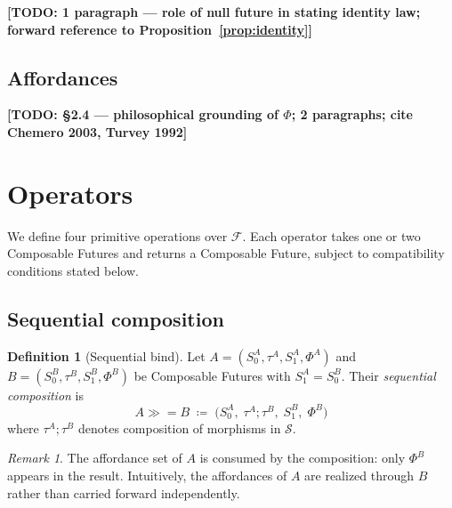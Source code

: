 \documentclass[11pt, a4paper]{article}
\theoremstyle{plain}
\theoremstyle{definition}
\newtheorem{definition}[theorem]{Definition}
\theoremstyle{remark}
\newtheorem{remark}[theorem]{Remark}
\newcommand{\bind}{\mathbin{\gg\!=}}          %
\newcommand{\Fut}{\mathcal{F}}                 %
\newcommand{\States}{\mathcal{S}}              %
\newcommand{\Szero}{S_0}                       %
\newcommand{\Sone}{S_1}                        %
\newcommand{\traj}{\tau}                       %
\newcommand{\aff}{\Phi}                        %
\begin{document}
\textbf{[TODO: 1 paragraph — role of null future in stating identity law;
forward reference to Proposition~\ref{prop:identity}]}

\subsection{Affordances}


\textbf{[TODO: \S2.4 — philosophical grounding of $\aff$; 2 paragraphs;
cite Chemero 2003, Turvey 1992]}

\section{Operators}
\label{sec:operators}

We define four primitive operations over $\Fut$.
Each operator takes one or two Composable Futures and returns a Composable
Future, subject to compatibility conditions stated below.

\subsection{Sequential composition}

\begin{definition}[Sequential bind]
\label{def:bind}
Let $A = (\Szero^A, \traj^A, \Sone^A, \aff^A)$ and
$B = (\Szero^B, \traj^B, \Sone^B, \aff^B)$ be Composable Futures
with $\Sone^A = \Szero^B$.
Their \emph{sequential composition} is
\[
  A \bind B \;\coloneqq\;
  \bigl(\Szero^A,\; \traj^A ; \traj^B,\; \Sone^B,\; \aff^B\bigr)
\]
where $\traj^A ; \traj^B$ denotes composition of morphisms in $\States$.
\end{definition}

\begin{remark}
The affordance set of $A$ is consumed by the composition: only $\aff^B$
appears in the result. Intuitively, the affordances of $A$ are realized
through $B$ rather than carried forward independently.
\end{remark}
\end{document}
